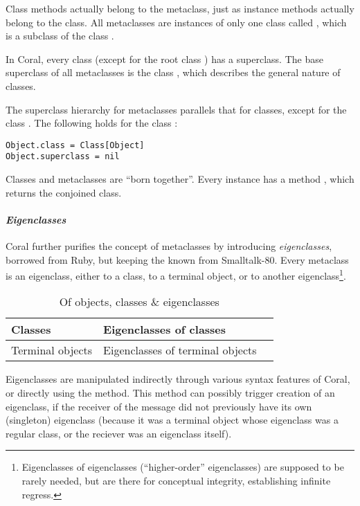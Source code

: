 Class methods actually belong to the metaclass, just as instance methods actually belong to the class. All metaclasses are instances of only one class called , which is a subclass of the class . 

In Coral, every class (except for the root class ) has a superclass. The base superclass of all metaclasses is the class , which describes the general nature of classes. 

The superclass hierarchy for metaclasses parallels that for classes, except for the class . The following holds for the class :
\begin{lstlisting}[deletekeywords={class}]
Object.class = Class[Object]
Object.superclass = nil
\end{lstlisting}

Classes and metaclasses are ``born together''. Every  instance has a method , which returns the conjoined class. 

\paragraph{\em Eigenclasses}
Coral further purifies the concept of metaclasses by introducing {\em eigenclasses}, borrowed from Ruby, but keeping the  known from Smalltalk-80. Every metaclass is an eigenclass, either to a class, to a terminal object, or to another eigenclass\footnote{Eigenclasses of eigenclasses (``higher-order'' eigenclasses) are supposed to be rarely needed, but are there for conceptual integrity, establishing infinite regress.}. 

\begin{table}[ht]
  \centering
  \caption{Of objects, classes \& eigenclasses}
  \renewcommand{\arraystretch}{1.7}
  \begin{tabular}{ | >{\centering}m{3.5cm} | >{\centering}m{3.5cm} | >{\centering\arraybackslash}m{6cm} | }
  	\hline
    Classes & Eigenclasses of classes & \multirow{2}{*}{Eigenclasses of eigenclasses} \\ \cline{1-2}
    Terminal objects & Eigenclasses of terminal objects & \\
    \hline
  \end{tabular}
\end{table}

Eigenclasses are manipulated indirectly through various syntax features of Coral, or directly using the  method. This method can possibly trigger creation of an eigenclass, if the receiver of the  message did not previously have its own (singleton) eigenclass (because it was a terminal object whose eigenclass was a regular class, or the reciever was an eigenclass itself). 

